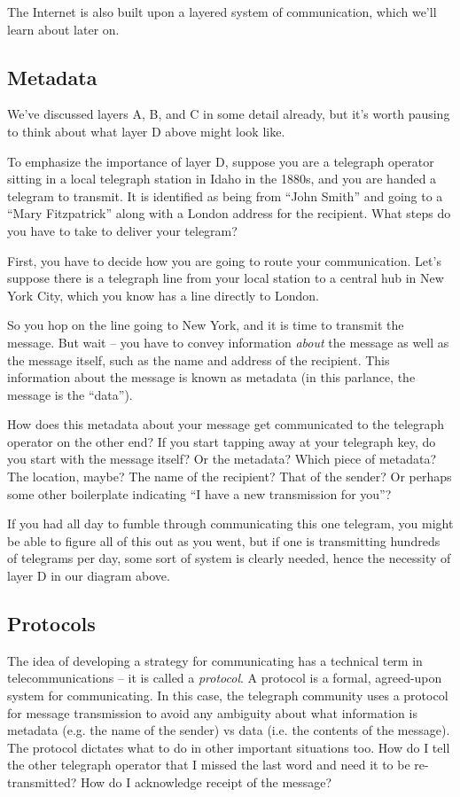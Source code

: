 \documentclass[UTF8]{book}
\begin{document}
\begin{CJK}{UTF8}{gbsn}
The Internet is also built upon a layered system of communication, which we'll learn about later on.

\subsection{Metadata}

We've discussed layers A, B, and C in some detail already, but it's worth pausing to think about what layer D above might look like.

To emphasize the importance of layer D, suppose you are a telegraph operator sitting in a local telegraph station in Idaho in the 1880s, and you are handed a telegram to transmit. It is identified as being from ``John Smith'' and going to a ``Mary Fitzpatrick'' along with a London address for the recipient. What steps do you have to take to deliver your telegram?

First, you have to decide how you are going to route your communication. Let's suppose there is a telegraph line from your local station to a central hub in New York City, which you know has a line directly to London.

So you hop on the line going to New York, and it is time to transmit the message. But wait -- you have to convey information \emph{about} the message as well as the message itself, such as the name and address of the recipient. This information about the message is known as metadata (in this parlance, the message is the ``data'').

How does this metadata about your message get communicated to the telegraph operator on the other end? If you start tapping away at your telegraph key, do you start with the message itself? Or the metadata? Which piece of metadata? The location, maybe? The name of the recipient? That of the sender? Or perhaps some other boilerplate indicating ``I have a new transmission for you''?

If you had all day to fumble through communicating this one telegram, you might be able to figure all of this out as you went, but if one is transmitting hundreds of telegrams per day, some sort of system is clearly needed, hence the necessity of layer D in our diagram above.

\subsection{Protocols}

The idea of developing a strategy for communicating has a technical term in telecommunications -- it is called a \emph{protocol}. A protocol is a formal, agreed-upon system for communicating. In this case, the telegraph community uses a protocol for message transmission to avoid any ambiguity about what information is metadata (e.g. the name of the sender) vs data (i.e. the contents of the message). The protocol dictates what to do in other important situations too. How do I tell the other telegraph operator that I missed the last word and need it to be re-transmitted? How do I acknowledge receipt of the message?


\end{CJK}
\end{document}
